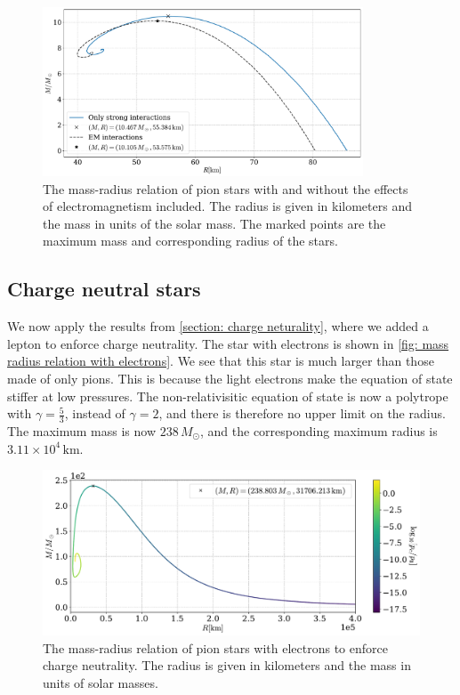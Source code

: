\begin{figure}[!htb]
    \centering
    \includegraphics[width=0.85\textwidth]{../scripts/figurer/pion_star/mass_radius_pion_star_compare.pdf}
    \caption{
        The mass-radius relation of pion stars with and without the effects of electromagnetism included.
        The radius is given in kilometers and the mass in units of the solar mass.
        The marked points are the maximum mass and corresponding radius of the stars.
        }
        \label{fig: mass-radius relation comparison}
\end{figure}

\clearpage



\subsection{Charge neutral stars}


We now apply the results from \autoref{section: charge neturality}, where we added a lepton to enforce charge neutrality.
The star with electrons is shown in  \autoref{fig: mass radius relation with electrons}.
We see that this star is much larger than those made of only pions.
This is because the light electrons make the equation of state stiffer at low pressures.
The non-relativisitic equation of state is now a polytrope with $\gamma = \frac{5}{3}$, instead of $\gamma = 2$, and there is therefore no upper limit on the radius.
The maximum mass is now $238\, M_\odot $, and the corresponding maximum radius is $ 3.11\times 10^4 \,\text{km}$.

\begin{figure}[!htb]
    \centering
    \includegraphics[width=\textwidth]{../scripts/figurer/pion_star/mass_radius__e.pdf}
    \caption{
        The mass-radius relation of pion stars with electrons to enforce charge neutrality.
        The radius is given in kilometers and the mass in units of solar masses.
        }
        \label{fig: mass radius relation with electrons}
\end{figure}


